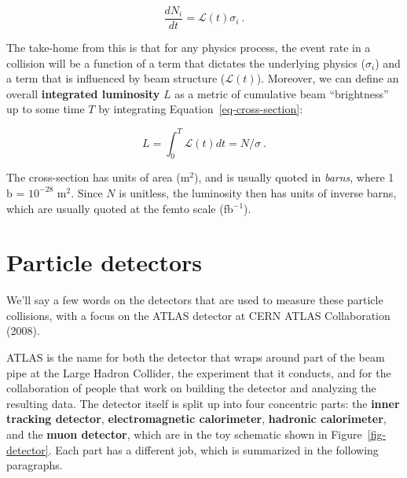 \documentclass[
  11pt,
  numbers=noendperiod]{book}
\begin{document}
\[
\frac{dN_i}{dt} = \mathcal{L}(t) \sigma_i~.
\]

The take-home from this is that for any physics process, the event rate
in a collision will be a function of a term that dictates the underlying
physics (\(\sigma_i\)) and a term that is influenced by beam structure
(\(\mathcal{L}(t)\)). Moreover, we can define an overall
\textbf{integrated luminosity} \(L\) as a metric of cumulative beam
``brightness'' up to some time \(T\) by integrating
Equation~\ref{eq-cross-section}:

\[
L = \int_0^T \mathcal{L}(t) dt = N/\sigma~.
\]

The cross-section has units of area (m\(^2\)), and is usually quoted in
\emph{barns}, where 1 b = \(10^{-28}\) m\(^2\). Since \(N\) is unitless,
the luminosity then has units of inverse barns, which are usually quoted
at the femto scale (fb\(^{-1}\)).

\hypertarget{particle-detectors}{%
\section{Particle detectors}\label{particle-detectors}}

We'll say a few words on the detectors that are used to measure these
particle collisions, with a focus on the ATLAS detector at CERN ATLAS
Collaboration (2008).

ATLAS is the name for both the detector that wraps around part of the
beam pipe at the Large Hadron Collider, the experiment that it conducts,
and for the collaboration of people that work on building the detector
and analyzing the resulting data. The detector itself is split up into
four concentric parts: the \textbf{inner tracking detector},
\textbf{electromagnetic calorimeter}, \textbf{hadronic calorimeter}, and
the \textbf{muon detector}, which are in the toy schematic shown in
Figure~\ref{fig-detector}. Each part has a different job, which is
summarized in the following paragraphs.
\end{document}
